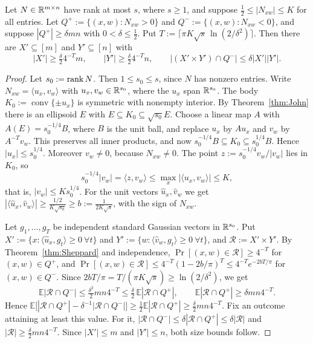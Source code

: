\begin{lemma}\label{lem:R}
Let $N\in\mathbb{R}^{m\times n}$ have rank at most $s$, where $s\ge 1$, and suppose $\tfrac12\le|N_{xw}|\le K$ for all entries. Let
$Q^+:=\{(x,w):N_{xw}>0\}$ and $Q^-:=\{(x,w):N_{xw}<0\}$, and suppose $|Q^+|\ge\delta mn$ with
$0<\delta\le\frac12$. Put $T:=\lceil\pi K\sqrt s\,\ln(2/\delta^2)\rceil$. Then there are $X'\subseteq[m]$ and
$Y'\subseteq[n]$ with
\[
|X'|\ge\tfrac\delta2 4^{-T}m,\qquad |Y'|\ge\tfrac\delta24^{-T}n,\qquad |(X'\times Y')\cap Q^-|\le\delta|X'||Y'|.
\]
\end{lemma}
\begin{proof}
Let $s_0:=\operatorname{rank} N$. Then $1\le s_0\le s$, since $N$ has nonzero entries. Write $N_{xw}=\langle u_x,v_w\rangle$ with
$u_x,v_w\in\mathbb{R}^{s_0}$, where the $u_x$ span $\mathbb{R}^{s_0}$. The body $K_0:=\operatorname{conv}\{\pm u_x\}$ is
symmetric with nonempty interior. By Theorem~\ref{thm:John} there is an ellipsoid $E$ with
$E\subseteq K_0\subseteq\sqrt{s_0}E$. Choose a linear map $A$ with $A(E)=s_0^{-1/4}B$, where $B$ is the unit
ball, and replace $u_x$ by $Au_x$ and $v_w$ by $A^{-T}v_w$. This preserves all inner products, and now
$s_0^{-1/4}B\subseteq K_0\subseteq s_0^{1/4}B$. Hence $|u_x|\le s_0^{1/4}$. Moreover $v_w\ne0$, because $N_{xw}\ne0$.
The point $z:=s_0^{-1/4}v_w/|v_w|$ lies in $K_0$, so
\[
s_0^{-1/4}|v_w|=\langle z,v_w\rangle\le\max_x|\langle u_x,v_w\rangle|\le K,
\]
that is, $|v_w|\le Ks_0^{1/4}$. For the unit vectors $\hat u_x,\hat v_w$ we get
$|\langle\hat u_x,\hat v_w\rangle|\ge \frac{1/2}{K\sqrt{s_0}}\ge b:=\frac1{2K\sqrt s}$, with the sign of $N_{xw}$.

Let $g_1,\dots,g_T$ be independent standard Gaussian vectors in $\mathbb{R}^{s_0}$. Put
$X':=\{x:\langle\hat u_x,g_t\rangle\ge0\ \forall t\}$ and $Y':=\{w:\langle\hat v_w,g_t\rangle\ge0\ \forall t\}$, and
$\mathcal R:=X'\times Y'$. By Theorem~\ref{thm:Sheppard} and independence, $\Pr[(x,w)\in\mathcal R]\ge 4^{-T}$ for
$(x,w)\in Q^+$, and $\Pr[(x,w)\in\mathcal R]\le4^{-T}(1-2b/\pi)^T\le 4^{-T}e^{-2bT/\pi}$ for $(x,w)\in Q^-$. Since
$2bT/\pi=T/(\pi K\sqrt s)\ge\ln(2/\delta^2)$, we get
\[
\mathbb E|\mathcal R\cap Q^-|\le\tfrac{\delta^2}{2}mn4^{-T}\le\tfrac\delta2\,\mathbb E|\mathcal R\cap Q^+|,
\qquad \mathbb E|\mathcal R\cap Q^+|\ge\delta mn4^{-T}.
\]
Hence $\mathbb E\bigl[|\mathcal R\cap Q^+|-\delta^{-1}|\mathcal R\cap Q^-|\bigr]\ge\frac12\mathbb E|\mathcal R\cap Q^+|
\ge\frac\delta2mn4^{-T}$. Fix an outcome attaining at least this value. For it,
$|\mathcal R\cap Q^-|\le\delta|\mathcal R\cap Q^+|\le\delta|\mathcal R|$ and
$|\mathcal R|\ge\frac\delta2 mn4^{-T}$. Since $|X'|\le m$ and $|Y'|\le n$, both size bounds follow.
\end{proof}


